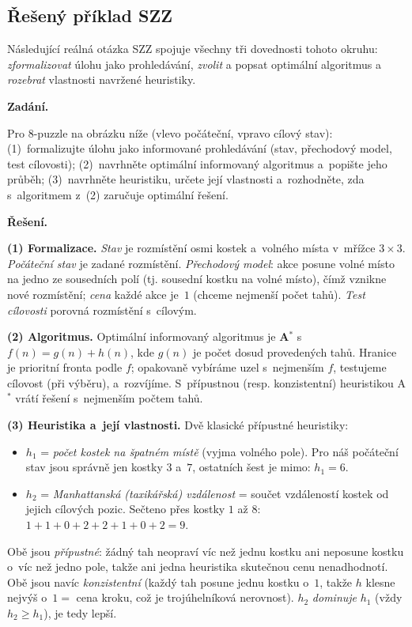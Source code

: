 \subsection{Řešený příklad SZZ}

Následující reálná otázka SZZ spojuje všechny tři dovednosti tohoto okruhu: \emph{zformalizovat} úlohu jako prohledávání, \emph{zvolit} a popsat optimální algoritmus a \emph{rozebrat} vlastnosti navržené heuristiky.

\begin{priklad}
\par
\textbf{Zadání.}\par
Pro 8-puzzle na obrázku níže (vlevo počáteční, vpravo cílový stav): (1)~formalizujte úlohu jako informované prohledávání (stav, přechodový model, test cílovosti); (2)~navrhněte optimální informovaný algoritmus a~popište jeho průběh; (3)~navrhněte heuristiku, určete její vlastnosti a~rozhodněte, zda s~algoritmem z~(2) zaručuje optimální řešení.

\medskip
\textbf{Řešení.}

\textbf{(1) Formalizace.} \emph{Stav} je rozmístění osmi kostek a~volného místa v~mřížce $3\times 3$. \emph{Počáteční stav} je zadané rozmístění. \emph{Přechodový model}: akce posune volné místo na jedno ze sousedních polí (tj. sousední kostku na volné místo), čímž vznikne nové rozmístění; \emph{cena} každé akce je~$1$ (chceme nejmenší počet tahů). \emph{Test cílovosti} porovná rozmístění s~cílovým.

\textbf{(2) Algoritmus.} Optimální informovaný algoritmus je \textbf{A${}^\ast$} s~$f(n)=g(n)+h(n)$, kde $g(n)$ je počet dosud provedených tahů. Hranice je prioritní fronta podle $f$; opakovaně vybíráme uzel s~nejmenším $f$, testujeme cílovost (při výběru), a~rozvíjíme. S~přípustnou (resp. konzistentní) heuristikou A${}^\ast$ vrátí řešení s~nejmenším počtem tahů.

\textbf{(3) Heuristika a~její vlastnosti.} Dvě klasické přípustné heuristiky:
\begin{itemize}
  \item $h_1$ = \emph{počet kostek na špatném místě} (vyjma volného pole). Pro náš počáteční stav jsou správně jen kostky $3$ a~$7$, ostatních šest je mimo: $h_1=\boxed{6}$.
  \item $h_2$ = \emph{Manhattanská (taxikářská) vzdálenost} = součet vzdáleností kostek od jejich cílových pozic. Sečteno přes kostky $1$ až $8$: $1+1+0+2+2+1+0+2 = \boxed{9}$.
\end{itemize}
Obě jsou \emph{přípustné}: žádný tah neopraví víc než jednu kostku ani neposune kostku o~víc než jedno pole, takže ani jedna heuristika skutečnou cenu nenadhodnotí. Obě jsou navíc \emph{konzistentní} (každý tah posune jednu kostku o~$1$, takže $h$ klesne nejvýš o~$1 = $ cena kroku, což je trojúhelníková nerovnost). $h_2$ \emph{dominuje} $h_1$ (vždy $h_2\ge h_1$), je tedy lepší.


\end{priklad}
